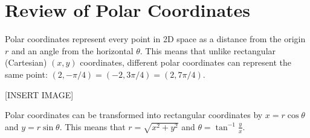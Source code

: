 \section{Review of Polar Coordinates}
\noindent
Polar coordinates represent every point in 2D space as a distance from the origin $r$ and an angle from the horizontal $\theta$. This means that unlike rectangular (Cartesian) $(x,y)$ coordinates, different polar coordinates can represent the same point: $(2, -\pi/4) = (-2, 3\pi/4)=(2, 7\pi/4)$.

[INSERT IMAGE]

\noindent
Polar coordinates can be transformed into rectangular coordinates by $x = r\cos{\theta}$ and $ y =r\sin{\theta}$. This means that $r = \sqrt{x^2+y^2}$ and $\theta = \tan^{-1}{\frac{y}{x}}$.



